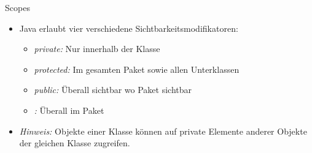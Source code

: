 {\begin{frame}[c]{Scopes}
   \begin{itemize}[<+(1)->]
      \itemsep13pt
      \item Java erlaubt vier verschiedene Sichtbarkeitsmodifikatoren: \begin{itemize}
         \item \textit{private:} Nur innerhalb der Klasse
         \item \textit{protected:} Im gesamten Paket sowie allen Unterklassen
         \item \textit{public:} Überall sichtbar wo Paket sichtbar
         \item \textit{:} Überall im Paket
     \end{itemize}
     \item \textit{Hinweis:} Objekte einer Klasse können auf private Elemente anderer Objekte der gleichen Klasse zugreifen.
   \end{itemize}
\end{frame}


}
